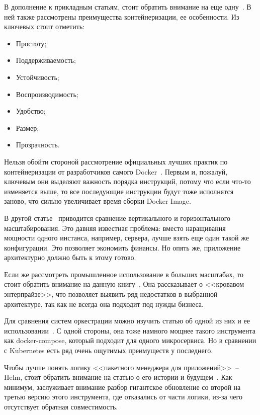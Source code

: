 В дополнение к прикладным статьям, стоит обратить внимание на еще одну~\cite{gruening2018recommendations}. В ней также рассмотрены преимущества контейнеризации, ее особенности. Из ключевых стоит отметить:
\begin{itemize}
    \item Простоту;
    \item Поддерживаемость;
    \item Устойчивость;
    \item Воспроизводимость;
    \item Удобство;
    \item Размер;
    \item Прозрачность.
\end{itemize}

Нельзя обойти стороной рассмотрение официальных лучших практик по контейнеризации от разработчиков самого Docker~\cite{docker:best-practicies}. Первым и, пожалуй, ключевым они выделяют важность порядка инструкций, потому что если что-то изменяется выше, то все последующие инструкции будут тоже исполнятся заново, что сильно увеличивает время сборки Docker Image.

В другой статье~\cite{wang2019developing} приводится сравнение вертикального и горизонтального масштабирования. Это давняя известная проблема: вместо наращивания мощности одного инстанса, например, сервера, лучше взять еще один такой же конфигурации. Это позволяет экономить финансы. Но опять же, приложение архитектурно должно быть к этому готово.

Если же рассмотреть промышленное использование в больших масштабах, то стоит обратить внимание на данную книгу~\cite{indrasiri2018microservices}. Она рассказывает о <<кровавом энтерпрайзе>>, что позволяет выявить ряд недостатков в выбранной архитектуре, так как не всегда она подходит под нужды бизнеса.

Для сравнения систем оркестрации можно изучить статью об одной из них и ее использовании~\cite{naik2016building}. С одной стороны, она тоже намного мощнее такого инструмента как docker-compose, который подходит для одного микросервиса. Но в сравнении с Kubernetes есть ряд очень ощутимых преимуществ у последнего.

Чтобы лучше понять логику <<пакетного менеджера для приложений>>\ -- Helm, стоит обратить внимание на статью о его истории и будущем~\cite{habr:flant:helm}. Как минимум, заслуживает внимание разбор гигантское обновление со второй на третью версию этого инструмента, где отказались от части логики, из-за чего отсутствует обратная совместимость.

